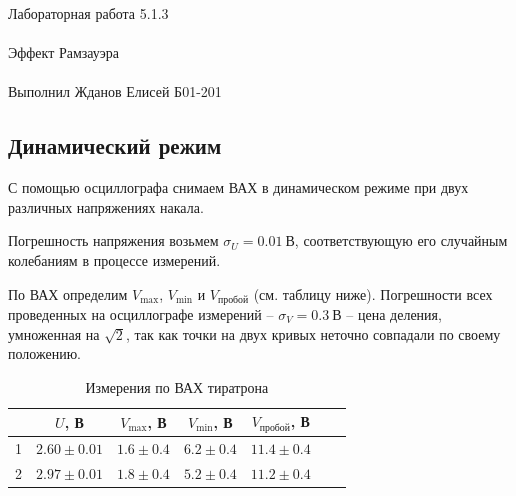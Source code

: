 \documentclass{astroedu-lab}
\begin{document}
\begin{problem}{\huge Лабораторная работа 5.1.3\\\\Эффект Рамзауэра\\\\Выполнил Жданов Елисей Б01-201}

\subsection{Динамический режим}

С помощью осциллографа снимаем ВАХ в динамическом режиме при двух различных напряжениях накала.

Погрешность напряжения возьмем $\sigma_U = 0.01~\text{В}$, соответствующую его случайным колебаниям в процессе измерений.

По ВАХ определим $V_{\text{max}}$, $V_{\text{min}}$ и $V_{\text{пробой}}$ (см. таблицу ниже). Погрешности всех проведенных на осциллографе измерений -- $\sigma_V = 0.3~\text{В}$ -- цена деления, умноженная на $\sqrt{2}$, так как точки на двух кривых неточно совпадали по своему положению.

\begin{center}
	
\end{center}

\begin{table}[h]
\begin{tabular}{|c|c|c|c|c|c|c|}
\hline
  & $U$, В & $V_{\text{max}}$, В & $V_{\text{min}}$, В & $V_{\text{пробой}}$, В \\ \hline
1 & $2.60  \pm  0.01$          & $1.6 \pm 0.4$                   & $6.2 \pm 0.4$                 & $11.4 \pm 0.4$                        \\ \hline
2 & $2.97   \pm 0.01$          & $1.8 \pm 0.4$                   & $5.2 \pm 0.4$                 & $11.2 \pm 0.4$                   \\ \hline
\end{tabular}
\centering
\caption{Измерения по ВАХ тиратрона}
\end{table}


\end{problem}
\end{document}
